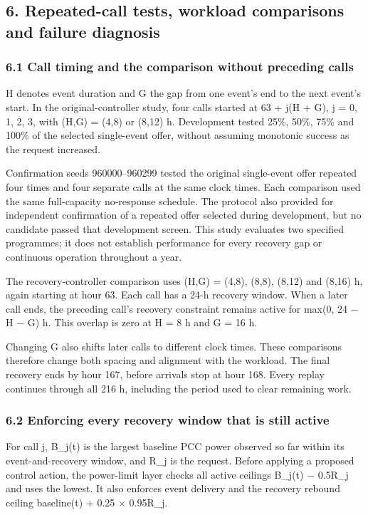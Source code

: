 \documentclass[10pt,a4paper]{article}
\begin{document}
\subsection{6. Repeated-call tests, workload comparisons and failure diagnosis}

\subsubsection{6.1 Call timing and the comparison without preceding calls}

H denotes event duration and G the gap from one event's end to the next event's start. In the original-controller study, four calls started at 63 + j(H + G), j = 0, 1, 2, 3, with (H,G) = (4,8) or (8,12) h. Development tested 25\%, 50\%, 75\% and 100\% of the selected single-event offer, without assuming monotonic success as the request increased.


Confirmation seeds 960000–960299 tested the original single-event offer repeated four times and four separate calls at the same clock times. Each comparison used the same full-capacity no-response schedule. The protocol also provided for independent confirmation of a repeated offer selected during development, but no candidate passed that development screen. This study evaluates two specified programmes; it does not establish performance for every recovery gap or continuous operation throughout a year.


The recovery-controller comparison uses (H,G) = (4,8), (8,8), (8,12) and (8,16) h, again starting at hour 63. Each call has a 24-h recovery window. When a later call ends, the preceding call's recovery constraint remains active for max(0, 24 − H − G) h. This overlap is zero at H = 8 h and G = 16 h.


Changing G also shifts later calls to different clock times. These comparisons therefore change both spacing and alignment with the workload. The final recovery ends by hour 167, before arrivals stop at hour 168. Every replay continues through all 216 h, including the period used to clear remaining work.


\subsubsection{6.2 Enforcing every recovery window that is still active}

For call j, B\_j(t) is the largest baseline PCC power observed so far within its event-and-recovery window, and R\_j is the request. Before applying a proposed control action, the power-limit layer checks all active ceilings B\_j(t) − 0.5R\_j and uses the lowest. It also enforces event delivery and the recovery rebound ceiling baseline(t) + 0.25 × 0.95R\_j.
\end{document}
